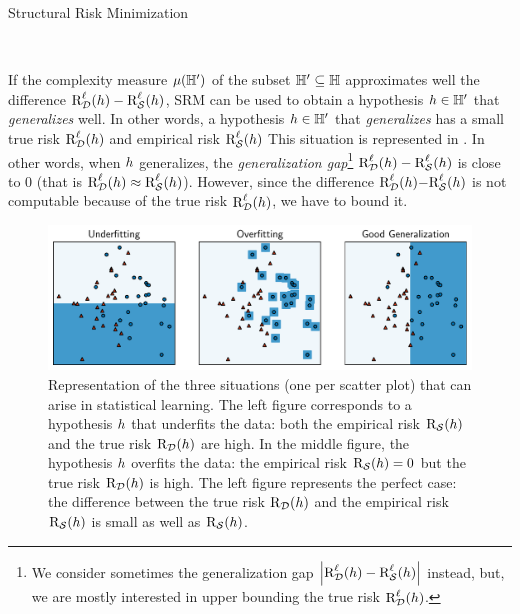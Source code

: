 \begin{algorithm}[H]
  \caption{Structural Risk Minimization}
  \begin{algorithmic}
    \\
\end{algorithmic}
\label{chap:intro:algo:srm}
\end{algorithm}

If the complexity measure $\operatorname{\mu}(\mathbb{H}')$ of the subset $\mathbb{H}'\subseteq\mathbb{H}$ approximates well the difference $\text{R}^{\ell}_{\mathcal{D}}(h)-\text{R}^{\ell}_{\mathcal{S}}(h)$, SRM can be used to obtain a hypothesis $h\in\mathbb{H}'$ that {\it generalizes} well.
In other words, a hypothesis $h\in\mathbb{H}'$ that {\it generalizes} has a small true risk $\text{R}^{\ell}_{\mathcal{D}}(h)$ and empirical risk $\text{R}^{\ell}_{\mathcal{S}}(h)$ 
This situation is represented in .
In other words, when $h$ generalizes, the {\it generalization gap}\footnote{We consider sometimes the generalization gap  $\left\vert\text{R}^{\ell}_{\mathcal{D}}(h)-\text{R}^{\ell}_{\mathcal{S}}(h)\right\vert$ instead, but, we are mostly interested in upper bounding the true risk $\text{R}^{\ell}_{\mathcal{D}}(h)$.} $\text{R}^{\ell}_{\mathcal{D}}(h)-\text{R}^{\ell}_{\mathcal{S}}(h)$ is close to $0$ (that is $\text{R}^{\ell}_{\mathcal{D}}(h)\approx\text{R}^{\ell}_{\mathcal{S}}(h)$).
However, since the difference $\text{R}^{\ell}_{\mathcal{D}}(h){-}\text{R}^{\ell}_{\mathcal{S}}(h)$ is not computable because of the true risk $\text{R}^{\ell}_{\mathcal{D}}(h)$, we have to bound it.

\begin{figure}[H]
    \centering
    \includegraphics[width=1.0\textwidth]{chapter_1/figures/overfitting.pdf}
    \caption[Representation of the Underfitting, Overfitting and the Generalization]{
    Representation of the three situations (one per scatter plot) that can arise in statistical learning.
    The left figure corresponds to a hypothesis $h$ that underfits the data: both the empirical risk $\text{R}_{\mathcal{S}}(h)$ and the true risk $\text{R}_{\mathcal{D}}(h)$ are high.
    In the middle figure, the hypothesis $h$ overfits the data: the empirical risk $\text{R}_{\mathcal{S}}(h)=0$ but the true risk $\text{R}_{\mathcal{D}}(h)$ is high.
    The left figure represents the perfect case: the difference between the true risk $\text{R}_{\mathcal{D}}(h)$ and the empirical risk $\text{R}_{\mathcal{S}}(h)$ is small as well as $\text{R}_{\mathcal{S}}(h)$.
    }
    \label{chap:intro:fig:overfitting}
\end{figure}

